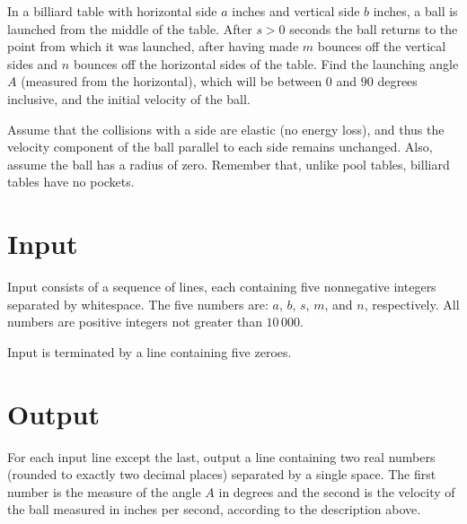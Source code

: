 

In a billiard table with horizontal side $a$ inches and vertical side
$b$ inches, a ball is launched from the middle of the table.  After
$s > 0$ seconds the ball returns to the point from which it was
launched, after having made $m$ bounces off the vertical sides and
$n$ bounces off the horizontal sides of the table.  Find the launching
angle $A$ (measured from the horizontal), which will be between $0$ and
$90$ degrees inclusive, and the initial velocity of the ball.

Assume that the collisions with a side are elastic (no energy loss),
and thus the velocity component of the ball parallel to each side remains
unchanged.  Also, assume the ball has a radius of zero.  Remember that, unlike
pool tables, billiard tables have no pockets.

\section*{Input}

Input consists of a sequence of lines, each containing five nonnegative
integers separated by whitespace.  The five numbers are: $a$, $b$,
$s$, $m$, and $n$, respectively.  All numbers are positive
integers not greater than $10\,000$.

Input is terminated by a line containing five zeroes.

\section*{Output}

For each input line except the last, output a line containing two real
numbers (rounded to exactly two decimal places) separated by a single space.  The
first number is the measure of the angle $A$ in degrees and the second
is the velocity of the ball measured in inches per second, according to the
description above.

